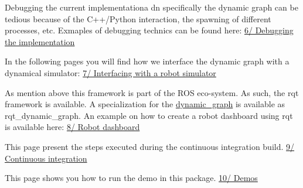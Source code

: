 Debugging the current implementationa dn specifically the dynamic graph can be tedious because of the C++/\+Python interaction, the spawning of different processes, etc. Exmaples of debugging technics can be found here\+: \hyperlink{subpage_debugging}{6/ Debugging the implementation}

In the following pages you will find how we interface the dynamic graph with a dynamical simulator\+: \hyperlink{subpage_robot_simulation}{7/ Interfacing with a robot simulator}

As mention above this framework is part of the R\+OS eco-\/system. As such, the rqt framework is available. A specialization for the \hyperlink{namespacedynamic__graph}{dynamic\+\_\+graph} is available as rqt\+\_\+dynamic\+\_\+graph. An example on how to create a robot dashboard using rqt is available here\+: \hyperlink{subpage_robot_dashboard}{8/ Robot dashboard}

This page present the steps executed during the continuous integration build. \hyperlink{subpage_ci}{9/ Continuous integration}

This page shows you how to run the demo in this package. \hyperlink{subpage_demos}{10/ Demos} 